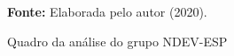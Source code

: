 \begin{figure}[ht!]
\centering

\caption{\textmd{Quadro da análise do grupo NDEV-ESP}}
\label{fig:quadro:grupondevesp}

\par\medskip\textbf{Fonte:} Elaborada pelo autor (2020). \par\medskip

\end{figure}


